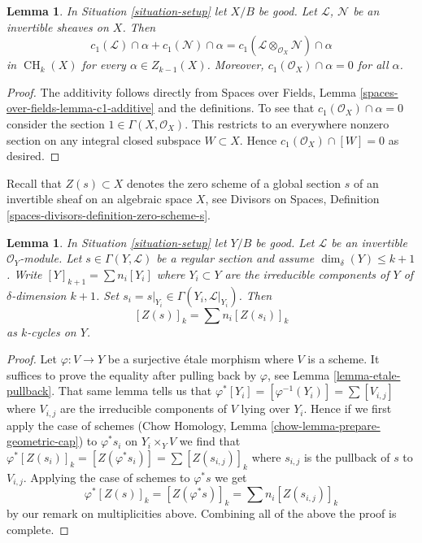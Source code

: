 \documentclass{stacks-project}
\theoremstyle{plain}
\newtheorem{lemma}[subsection]{Lemma}
\theoremstyle{definition}
\theoremstyle{remark}
\numberwithin{equation}{subsection}
\def\CH{\mathop{\mathrm{CH}}\nolimits}
\begin{document}
\begin{lemma}
\label{lemma-c1-cap-additive}
In Situation \ref{situation-setup} let $X/B$ be good.
Let $\mathcal{L}$, $\mathcal{N}$ be an invertible sheaves on $X$.
Then
$$
c_1(\mathcal{L}) \cap \alpha  + c_1(\mathcal{N}) \cap \alpha =
c_1(\mathcal{L} \otimes_{\mathcal{O}_X} \mathcal{N}) \cap \alpha
$$
in $\CH_k(X)$ for every $\alpha \in Z_{k - 1}(X)$. Moreover,
$c_1(\mathcal{O}_X) \cap \alpha = 0$ for all $\alpha$.
\end{lemma}

\begin{proof}
The additivity follows directly from
Spaces over Fields, Lemma \ref{spaces-over-fields-lemma-c1-additive}
and the definitions. To see that $c_1(\mathcal{O}_X) \cap \alpha = 0$
consider the section $1 \in \Gamma(X, \mathcal{O}_X)$. This restricts
to an everywhere nonzero section on any integral closed subspace
$W \subset X$. Hence $c_1(\mathcal{O}_X) \cap [W] = 0$ as desired.
\end{proof}

\noindent
Recall that $Z(s) \subset X$ denotes the zero scheme of a global section
$s$ of an invertible sheaf on an algebraic space $X$, see
Divisors on Spaces, Definition \ref{spaces-divisors-definition-zero-scheme-s}.

\begin{lemma}
\label{lemma-prepare-geometric-cap}
In Situation \ref{situation-setup} let $Y/B$ be good.
Let $\mathcal{L}$ be an invertible $\mathcal{O}_Y$-module.
Let $s \in \Gamma(Y, \mathcal{L})$ be a regular section and
assume $\dim_\delta(Y) \leq k + 1$.
Write $[Y]_{k + 1} = \sum n_i[Y_i]$ where $Y_i \subset Y$ are the
irreducible components of $Y$ of $\delta$-dimension $k + 1$.
Set $s_i = s|_{Y_i} \in \Gamma(Y_i, \mathcal{L}|_{Y_i})$. Then
\begin{equation}
\label{equation-equal-as-cycles}
[Z(s)]_k =  \sum n_i[Z(s_i)]_k
\end{equation}
as $k$-cycles on $Y$.
\end{lemma}

\begin{proof}
Let $\varphi : V \to Y$ be a surjective \'etale morphism where $V$
is a scheme. It suffices to prove the equality after pulling back
by $\varphi$, see Lemma \ref{lemma-etale-pullback}.
That same lemma tells us that
$\varphi^*[Y_i] = [\varphi^{-1}(Y_i)] = \sum [V_{i, j}]$
where $V_{i, j}$ are the irreducible components of $V$ lying over $Y_i$.
Hence if we first apply the case of schemes
(Chow Homology, Lemma \ref{chow-lemma-prepare-geometric-cap}) to
$\varphi^*s_i$ on $Y_i \times_Y V$ we
find that $\varphi^*[Z(s_i)]_k = [Z(\varphi^*s_i)] =
\sum [Z(s_{i, j})]_k$ where $s_{i, j}$ is the pullback
of $s$ to $V_{i, j}$. Applying the case of schemes to $\varphi^*s$ we get
$$
\varphi^*[Z(s)]_k =
[Z(\varphi^*s)]_k =
\sum n_i[Z(s_{i, j})]_k
$$
by our remark on multiplicities above.
Combining all of the above the proof is complete.
\end{proof}
\end{document}
